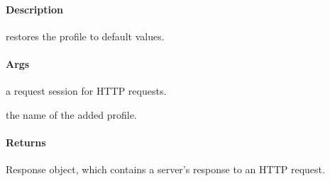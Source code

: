 \documentclass[letterpaper,10pt,english]{sphinxmanual}
\begin{document}
\begin{fulllineitems}
\label{\detokenize{gemini_perception_API:gemini_perception_API.restore_to_defaults}}
\pysigstartsignatures
{}
\pysigstopsignatures

\paragraph{Description}
\label{\detokenize{gemini_perception_API:id32}}
\sphinxAtStartPar
restores the profile to default values.


\paragraph{Args}
\label{\detokenize{gemini_perception_API:id33}}\begin{description}
\sphinxAtStartPar
a request session for HTTP requests.

\sphinxAtStartPar
the name of the added profile.

\end{description}


\paragraph{Returns}
\label{\detokenize{gemini_perception_API:id34}}\begin{description}
\sphinxAtStartPar
Response object, which contains a server’s response to an HTTP request.

\end{description}

\end{fulllineitems}

\end{document}
